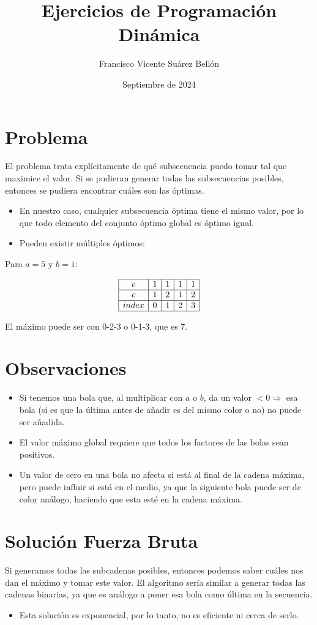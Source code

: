 \documentclass{article}
\title{Ejercicios de Programación Dinámica}
\author{Francisco Vicente Suárez Bellón}
\date{Septiembre de 2024}
\begin{document}
\maketitle

\section*{Problema}
El problema trata explícitamente de qué subsecuencia puedo tomar tal que maximice el valor. Si se pudieran generar todas las subsecuencias posibles, entonces se pudiera encontrar cuáles son las óptimas.
\begin{itemize}
    \item En nuestro caso, cualquier subsecuencia óptima tiene el mismo valor, por lo que todo elemento del conjunto óptimo global es óptimo igual.
    \item Pueden existir múltiples óptimos:
\end{itemize}

Para $a=5$ y $b=1$:

\[
\begin{array}{|c|c|c|c|c|}
\hline
v & 1 & 1 & 1 & 1 \\
\hline
c & 1 & 2 & 1 & 2 \\
\hline
index & 0 & 1 & 2 & 3 \\
\hline
\end{array}
\]

El máximo puede ser con 0-2-3 o 0-1-3, que es 7.

\section*{Observaciones}
\begin{itemize}
    \item Si tenemos una bola que, al multiplicar con $a$ o $b$, da un valor $< 0 \Rightarrow$ esa bola (si es que la última antes de añadir es del mismo color o no) no puede ser añadida.
    \item El valor máximo global requiere que todos los factores de las bolas sean positivos.
    \item Un valor de cero en una bola no afecta si está al final de la cadena máxima, pero puede influir si está en el medio, ya que la siguiente bola puede ser de color análogo, haciendo que esta esté en la cadena máxima.
\end{itemize}

\section*{Solución Fuerza Bruta}
Si generamos todas las subcadenas posibles, entonces podemos saber cuáles nos dan el máximo y tomar este valor. El algoritmo sería similar a generar todas las cadenas binarias, ya que es análogo a poner esa bola como última en la secuencia.
\begin{itemize}
    \item Esta solución es exponencial, por lo tanto, no es eficiente ni cerca de serlo.
\end{itemize}
\end{document}

